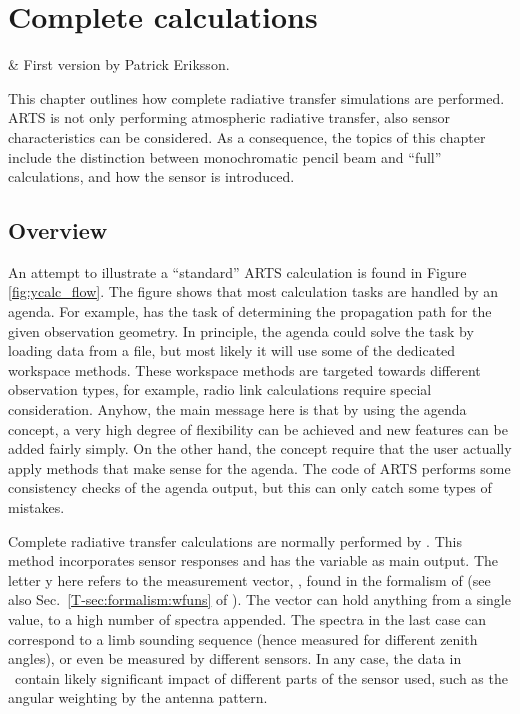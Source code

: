 \chapter{Complete calculations}
 \label{sec:complcalcs}

 & First version by Patrick Eriksson.\\
\stophistory

\graphicspath{{Figs/rte/}}

This chapter outlines how complete radiative transfer simulations are
performed. ARTS is not only performing atmospheric radiative transfer, also
sensor characteristics can be considered. As a consequence, the topics of this
chapter include the distinction between monochromatic pencil beam and ``full''
calculations, and how the sensor is introduced.



\section{Overview}
%
An attempt to illustrate a ``standard'' ARTS calculation is found in Figure~
\ref{fig:ycalc_flow}. The figure shows that most calculation tasks are handled
by an agenda. For example,  has the task of
determining the propagation path for the given observation geometry. In
principle, the agenda could solve the task by loading data from a file, but
most likely it will use some of the dedicated workspace methods. These
workspace methods are targeted towards different observation types, for
example, radio link calculations require special consideration. Anyhow, the
main message here is that by using the agenda concept, a very high degree of
flexibility can be achieved and new features can be added fairly simply. On the
other hand, the concept require that the user actually apply methods that make
sense for the agenda. The code of ARTS performs some consistency checks of the
agenda output, but this can only catch some types of mistakes.

Complete radiative transfer calculations are normally performed by
. This method incorporates sensor responses and has the
variable  as main output. The letter y here refers to the
measurement vector, \MsrVct, found in the formalism of
\citet{rodgers:90,rodgers:00} (see also Sec.~\ref{T-sec:formalism:wfuns} of
\theory). The vector can hold anything from a single value, to a high number of
spectra appended. The spectra in the last case can correspond to a limb
sounding sequence (hence measured for different zenith angles), or even be
measured by different sensors. In any case, the data in \MsrVct\ contain likely
significant impact of different parts of the sensor used, such as the angular
weighting by the antenna pattern. 

